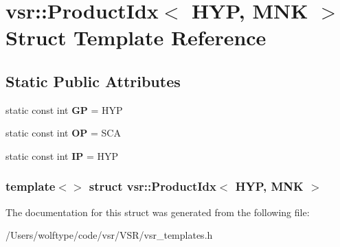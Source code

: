 \hypertarget{structvsr_1_1_product_idx_3_01_h_y_p_00_01_m_n_k_01_4}{\section{vsr\-:\-:Product\-Idx$<$ H\-Y\-P, M\-N\-K $>$ Struct Template Reference}
\label{structvsr_1_1_product_idx_3_01_h_y_p_00_01_m_n_k_01_4}
}
\subsection*{Static Public Attributes}
\begin{DoxyCompactItemize}
\item 
\hypertarget{structvsr_1_1_product_idx_3_01_h_y_p_00_01_m_n_k_01_4_a5c22c0f5be5ed777bec1ed64ab717a2c}{static const int {\bfseries G\-P} = H\-Y\-P}\label{structvsr_1_1_product_idx_3_01_h_y_p_00_01_m_n_k_01_4_a5c22c0f5be5ed777bec1ed64ab717a2c}

\item 
\hypertarget{structvsr_1_1_product_idx_3_01_h_y_p_00_01_m_n_k_01_4_a617eda697dc6a9e78dc4ac9d4f1345fe}{static const int {\bfseries O\-P} = S\-C\-A}\label{structvsr_1_1_product_idx_3_01_h_y_p_00_01_m_n_k_01_4_a617eda697dc6a9e78dc4ac9d4f1345fe}

\item 
\hypertarget{structvsr_1_1_product_idx_3_01_h_y_p_00_01_m_n_k_01_4_a75c474c625740ebd551e537974c45143}{static const int {\bfseries I\-P} = H\-Y\-P}\label{structvsr_1_1_product_idx_3_01_h_y_p_00_01_m_n_k_01_4_a75c474c625740ebd551e537974c45143}

\end{DoxyCompactItemize}
\subsubsection*{template$<$$>$ struct vsr\-::\-Product\-Idx$<$ H\-Y\-P, M\-N\-K $>$}



The documentation for this struct was generated from the following file\-:\begin{DoxyCompactItemize}
\item 
/\-Users/wolftype/code/vsr/\-V\-S\-R/vsr\-\_\-templates.\-h\end{DoxyCompactItemize}
